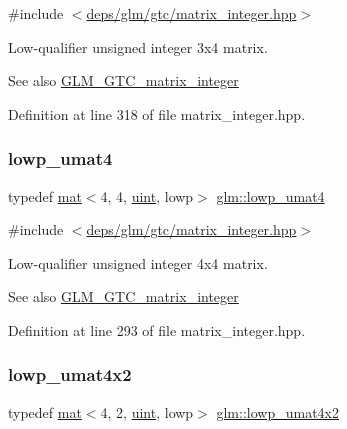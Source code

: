 {\ttfamily \#include $<$\hyperlink{matrix__integer_8hpp}{deps/glm/gtc/matrix\+\_\+integer.\+hpp}$>$}

Low-\/qualifier unsigned integer 3x4 matrix. \begin{DoxySeeAlso}{See also}
\hyperlink{group__gtc__matrix__integer}{G\+L\+M\+\_\+\+G\+T\+C\+\_\+matrix\+\_\+integer} 
\end{DoxySeeAlso}


Definition at line 318 of file matrix\+\_\+integer.\+hpp.

\mbox{\label{group__gtc__matrix__integer_ga41cc5d910308e4b471aa6543ce22dd20}} 
\subsubsection{\texorpdfstring{lowp\+\_\+umat4}{lowp\_umat4}}
{\footnotesize\ttfamily typedef \hyperlink{structglm_1_1mat}{mat}$<$4, 4, \hyperlink{group__core__precision_ga4fd29415871152bfb5abd588334147c8}{uint}, lowp$>$ \hyperlink{group__gtc__matrix__integer_ga41cc5d910308e4b471aa6543ce22dd20}{glm\+::lowp\+\_\+umat4}}



{\ttfamily \#include $<$\hyperlink{matrix__integer_8hpp}{deps/glm/gtc/matrix\+\_\+integer.\+hpp}$>$}

Low-\/qualifier unsigned integer 4x4 matrix. \begin{DoxySeeAlso}{See also}
\hyperlink{group__gtc__matrix__integer}{G\+L\+M\+\_\+\+G\+T\+C\+\_\+matrix\+\_\+integer} 
\end{DoxySeeAlso}


Definition at line 293 of file matrix\+\_\+integer.\+hpp.

\mbox{\label{group__gtc__matrix__integer_ga3fbd04409a7da041e61b868a002089f2}} 
\subsubsection{\texorpdfstring{lowp\+\_\+umat4x2}{lowp\_umat4x2}}
{\footnotesize\ttfamily typedef \hyperlink{structglm_1_1mat}{mat}$<$4, 2, \hyperlink{group__core__precision_ga4fd29415871152bfb5abd588334147c8}{uint}, lowp$>$ \hyperlink{group__gtc__matrix__integer_ga3fbd04409a7da041e61b868a002089f2}{glm\+::lowp\+\_\+umat4x2}}



